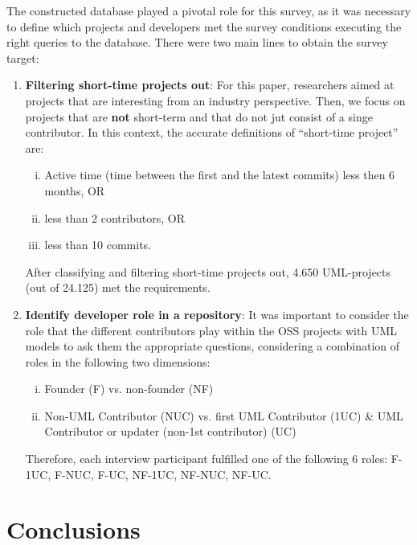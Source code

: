 \documentclass[a4paper, 12pt]{book}
\begin{document}
The constructed database played a pivotal role for this survey, as it was necessary to define which projects and developers met the
survey conditions executing the right queries to the database. There were two main lines to obtain the survey target:
\begin{enumerate}
  \item \textbf{Filtering short-time projects out}: For this paper, researchers aimed
  at projects that are interesting from an industry perspective. Then, we focus on projects that are \textbf{not} short-term and that
  do not jut consist of a singe contributor. In this context, the accurate definitions of ``short-time project'' are:
  \begin{enumerate}[i.]
    \item Active time (time between the first and the latest commits) less then 6 months, OR
    \item less than 2 contributors, OR
    \item less than 10 commits.
  \end{enumerate}
  After classifying and filtering short-time projects out, 4.650 UML-projects (out of 24.125) met the requirements.
  \item \textbf{Identify developer role in a repository}: It was important to consider the role that the different contributors
  play within the OSS projects with UML models to ask them the appropriate questions, considering a combination of roles in the
  following two dimensions:
  \begin{enumerate}[i.]
    \item Founder (F) vs. non-founder (NF)
    \item Non-UML Contributor (NUC) vs. first UML Contributor (1UC) \& UML Contributor or updater (non-1st contributor) (UC)
  \end{enumerate}
  Therefore, each interview participant fulfilled one of the following 6 roles: F-1UC, F-NUC, F-UC, NF-1UC, NF-NUC, NF-UC.
\end{enumerate}
\cleardoublepage
\chapter{Conclusions}
\label{chap:conclusions}
\end{document}
